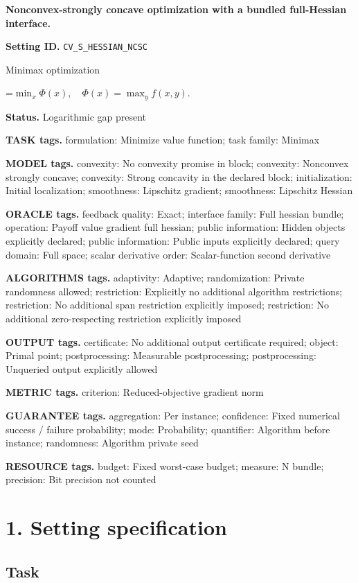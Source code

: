 \documentclass[10pt,a4paper]{article}
\newcommand{\AtlasMath}[1]{\par\begingroup\centering\setbox0=\hbox{$\displaystyle #1$}\ifdim\wd0>1.4\linewidth\typeout{ATLAS WIDE FORMULA: \the\wd0}\fi\ifdim\wd0>\linewidth\resizebox{\linewidth}{!}{\box0}\else\box0\fi\par\endgroup}
\begin{document}
\raggedright

{\LARGE\bfseries\sffamily\color{AtlasNavy} Nonconvex-strongly concave optimization with a bundled full-Hessian interface.\par}\vspace{5pt}
\textbf{Setting ID.} \texttt{CV\_\allowbreak{}S\_\allowbreak{}HESSIAN\_\allowbreak{}NCSC}

Minimax optimization


\AtlasMath{\min_x\Phi(x),\quad\Phi(x)=\max_y f(x,y).}


\textbf{Status.} Logarithmic gap present

\textbf{TASK tags.} formulation: Minimize value function; task family: Minimax

\textbf{MODEL tags.} convexity: No convexity promise in block; convexity: Nonconvex strongly concave; convexity: Strong concavity in the declared block; initialization: Initial localization; smoothness: Lipschitz gradient; smoothness: Lipschitz Hessian

\textbf{ORACLE tags.} feedback quality: Exact; interface family: Full hessian bundle; operation: Payoff value gradient full hessian; public information: Hidden objects explicitly declared; public information: Public inputs explicitly declared; query domain: Full space; scalar derivative order: Scalar-function second derivative

\textbf{ALGORITHMS tags.} adaptivity: Adaptive; randomization: Private randomness allowed; restriction: Explicitly no additional algorithm restrictions; restriction: No additional span restriction explicitly imposed; restriction: No additional zero-respecting restriction explicitly imposed

\textbf{OUTPUT tags.} certificate: No additional output certificate required; object: Primal point; postprocessing: Measurable postprocessing; postprocessing: Unqueried output explicitly allowed

\textbf{METRIC tags.} criterion: Reduced-objective gradient norm

\textbf{GUARANTEE tags.} aggregation: Per instance; confidence: Fixed numerical success / failure probability; mode: Probability; quantifier: Algorithm before instance; randomness: Algorithm private seed

\textbf{RESOURCE tags.} budget: Fixed worst-case budget; measure: N bundle; precision: Bit precision not counted

\section{1. Setting specification}
\subsection{Task}
\end{document}
